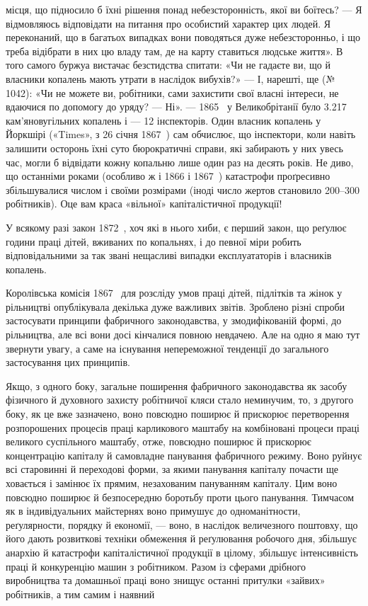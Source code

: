 \parcont{}  %
місця, що підносило б їхні рішення понад небезсторонність, якої
ви боїтесь? — Я відмовляюсь відповідати на питання про особистий
характер цих людей. Я переконаний, що в багатьох випадках
вони поводяться дуже небезсторонньо, і що треба відібрати
в них цю владу там, де на карту ставиться людське життя».
В того самого буржуа вистачає безстидства спитати: «Чи не гадаєте
ви, що й власники копалень мають утрати в наслідок вибухів?»
— І, нарешті, ще (№ 1042): «Чи не можете ви, робітники,
сами захистити свої власні інтереси, не вдаючися по допомогу
до уряду? — Ні». — 1865~ у Великобрітанії було \num{3.217} кам’яновугільних
копалень і — 12 інспекторів. Один власник копалень
у Йоркшірі («Times», з 26 січня 1867~) сам обчислює, що
інспектори, коли навіть залишити осторонь їхні суто бюрократичні
справи, які забирають у них увесь час, могли б відвідати
кожну копальню лише один раз на десять років. Не диво, що
останніми роками (особливо ж і 1866 і 1867~) катастрофи проґресивно
збільшувалися числом і своїми розмірами (іноді число
жертов становило 200--300 робітників). Оце вам краса «вільної»
капіталістичної продукції!

У всякому разі закон 1872~, хоч які в нього хиби, є перший
закон, що реґулює години праці дітей, вживаних по копальнях,
і до певної міри робить відповідальними за так звані нещасливі
випадки експлуататорів і власників копалень.

Королівська комісія 1867~ для розсліду умов праці дітей,
підлітків та жінок у рільництві опублікувала декілька дуже
важливих звітів. Зроблено різні спроби застосувати принципи
фабричного законодавства, у змодифікованій формі, до рільництва,
але всі вони досі кінчалися повною невдачею. Але на одно
я маю тут звернути увагу, а саме на існування непереможної
тенденції до загального застосування цих принципів.

Якщо, з одного боку, загальне поширення фабричного законодавства
як засобу фізичного й духовного захисту робітничої
кляси стало неминучим, то, з другого боку, як це вже зазначено,
воно повсюдно поширює й прискорює перетворення розпорошених
процесів праці карликового маштабу на комбіновані процеси
праці великого суспільного маштабу, отже, повсюдно поширює
й прискорює концентрацію капіталу й самовладне панування
фабричного режиму. Воно руйнує всі старовинні й переходові
форми, за якими панування капіталу почасти ще ховається і
замінює їх прямим, незахованим пануванням капіталу. Цим
воно повсюдно поширює й безпосередню боротьбу проти цього
панування. Тимчасом як в індивідуальних майстернях воно примушує
до одноманітности, реґулярности, порядку й економії, —
воно, в наслідок величезного поштовху, що його дають розвиткові
техніки обмеження й реґулювання робочого дня, збільшує
анархію й катастрофи капіталістичної продукції в цілому, збільшує
інтенсивність праці й конкуренцію машин з робітником. Разом
із сферами дрібного виробництва та домашньої праці воно знищує
останні притулки «зайвих» робітників, а тим самим і наявний
\parbreak{}  %
